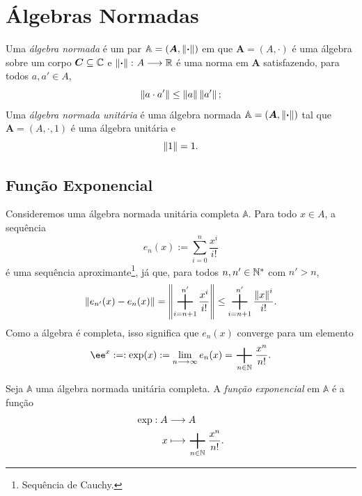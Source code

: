 \section{Álgebras Normadas}

\begin{defi}
Uma \emph{álgebra normada} é um par $\mathbb A = (\bm A,\left\Vert{\bm{\cdot}}\right\Vert)$ em que $\bm A = (A,\cdot)$ é uma álgebra sobre um corpo $\bm C \subseteq \mathbb{C}$ e $\left\Vert{\bm{\cdot}}\right\Vert\colon A \longrightarrow \mathbb{R}$ é uma norma em $\bm A$ satisfazendo, para todos $a,a' \in A$,
	\begin{equation*}
	\left\Vert{a \cdot a'}\right\Vert \leq \left\Vert{a}\right\Vert\left\Vert{a'}\right\Vert;
	\end{equation*}
Uma \emph{álgebra normada unitária} é uma álgebra normada $\mathbb A = (\bm A,\left\Vert{\bm{\cdot}}\right\Vert)$ tal que $\bm A = (A,\cdot,1)$ é uma álgebra unitária e
	\begin{equation*}
	\left\Vert{1}\right\Vert = 1.
	\end{equation*}
\end{defi}

\subsection{Função Exponencial}

Consideremos uma álgebra normada unitária completa $\mathbb A$. Para todo $x \in A$, a sequência
	\begin{equation*}
	e_n(x) := \sum_{i=0}^{n} \frac{x^i}{i!}
	\end{equation*}
é uma sequência aproximante\footnote{Sequência de Cauchy.}, já que, para todos $n,n' \in \mathbb{N}^*$ com $n' > n$,
	\begin{equation*}
	\nor{e_{n'}(x)-e_n(x)} = \nor{\sum_{i=n+1}^{n'} \frac{x^i}{i!}} \leq \sum_{i=n+1}^{n'} \frac{\nor{x}^i}{i!}.
	\end{equation*}
Como a álgebra é completa, isso significa que $e_n(x)$ converge para um elemento
	\begin{equation*}
	\ee^{x} :=: \exp(x) := \lim_{n \to \infty} e_n(x) = \sum_{n \in \N} \frac{x^n}{n!}.
	\end{equation*}

\begin{defi}
Seja $\mathbb A$ uma álgebra normada unitária completa. A \emph{função exponencial} em $\mathbb A$ é a função
	\begin{align*}
	\func{\exp}{A}{A}{x}{\sum_{n \in \N} \frac{x^n}{n!}.}
	\end{align*}
\end{defi}

